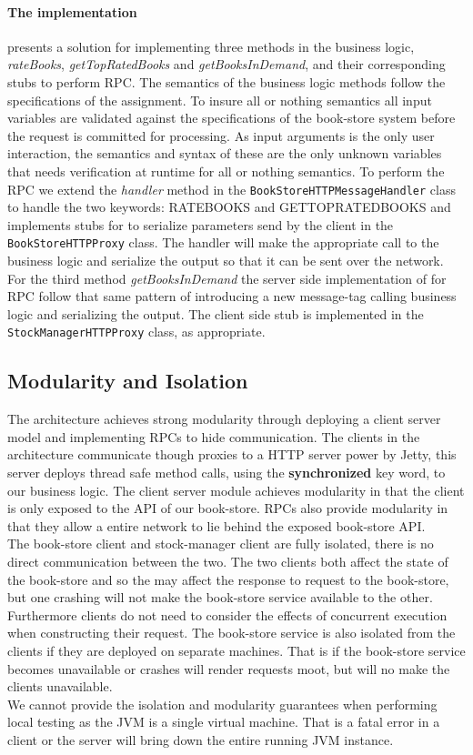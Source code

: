 \documentclass[a4paper]{article}
\begin{document}
\paragraph{The implementation} presents a solution for implementing three methods in the business logic, \textit{rateBooks}, \textit{getTopRatedBooks} and \textit{getBooksInDemand}, and their corresponding stubs to perform RPC. The semantics of the business logic methods follow the specifications of the assignment. To insure all or nothing semantics all input variables are validated against the specifications of the book-store system before the request is committed for processing. As input arguments is the only user interaction, the semantics and syntax of these are the only unknown variables that needs verification at runtime for all or nothing semantics. To perform the RPC we extend the \textit{handler} method in the \texttt{BookStoreHTTPMessageHandler} class to handle the two keywords: RATEBOOKS and GETTOPRATEDBOOKS and implements stubs for to serialize parameters send by the client in the \texttt{BookStoreHTTPProxy} class. The handler will make the appropriate call to the business logic and serialize the output so that it can be sent over the network. For the third method \textit{getBooksInDemand} the server side implementation of for RPC follow that same pattern of introducing a new message-tag calling business logic and serializing the output. The client side stub is implemented in the \texttt{StockManagerHTTPProxy} class, as appropriate.
\subsection{Modularity and Isolation}
The architecture achieves strong modularity through deploying a client server model and implementing RPCs to hide communication. The clients in the architecture communicate though proxies to a HTTP server power by Jetty, this server deploys thread safe method calls, using the \textbf{synchronized} key word, to our business logic. The client server module achieves modularity in that the client is only exposed to the API of our book-store. RPCs also provide modularity in that they allow a entire network to lie behind the exposed book-store API.\\
The book-store client and stock-manager client are fully isolated, there is no direct communication between the two. The two clients both affect the state of the book-store and so the may affect the response to request to the book-store, but one crashing will not make the book-store service available to the other. Furthermore clients do not need to consider the effects of concurrent execution when constructing their request. The book-store service is also isolated from the clients if they are deployed on separate machines. That is if the book-store service becomes unavailable or crashes will render requests moot, but will no make the clients unavailable.\\
We cannot provide the isolation and modularity guarantees when performing local testing as the JVM is a single virtual machine. That is a fatal error in a client or the server will bring down the entire running JVM instance.
\end{document}
